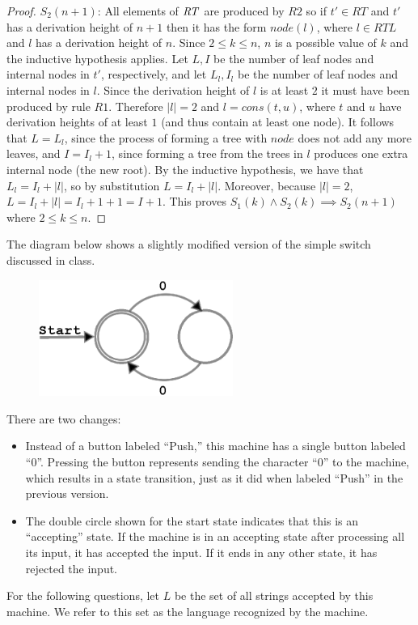 \documentclass[]{exam}
\begin{document}
\begin{questions}
\begin{parts}
\begin{solution}
\begin{proof}
$S_2(n+1)$: All elements of $\mbox{\it RT\/}$ are produced by $R2$ so if $t' \in RT$
and $t'$ has a derivation height of $n+ 1$ then it has the form $node(l)$, where 
$l \in RTL$ and $l$ has a derivation height of $n$. Since $2 \leq k \leq n$, 
$n$ is a possible value of $k$ and the inductive hypothesis applies.  Let $L, I$ 
be the number of leaf nodes and internal nodes in $t'$, respectively, and 
let $L_l,I_l$ be the number of leaf nodes and internal nodes in $l$. Since the 
derivation height of $l$ is at least $2$ it must have been produced by
rule $R1$. Therefore $|l| = 2$ and $l = cons(t,u)$, where $t$ and $u$ have
derivation heights of at least $1$ (and thus contain at least one node).
It follows that $L = L_l$, since the process of forming a tree with $node$ 
does not add any more leaves, and $I = I_l + 1$, since forming a tree from 
the trees in $l$ produces one extra internal node (the new root). By the 
inductive hypothesis, we have that $L_l = I_l + |l|$, so by substitution 
$L = I_l + |l|$. Moreover, because $|l| = 2$, $L = I_l + |l| = I_l + 1 + 1 = I +
1$. This proves $S_1(k) \land S_2(k) \implies S_2(n+1)$ where $2 \leq k \leq n$.
\end{proof}
\end{solution}
\end{parts}
\question The diagram below shows a slightly modified version of the simple
switch discussed in class. \\
\begin{figure}[h]
\centering
\includegraphics[width=2.5in, height=.75in,keepaspectratio=true]{evenzeroautomata.eps}
\label{2sp}
\end{figure}

There are two changes:
\begin{itemize}
\item Instead of a button labeled ``Push,'' this machine has a single button
labeled ``0''. Pressing the button represents sending the character ``0''
to the machine, which results in a state transition, just as it did when labeled
``Push'' in the previous version.
\item The double circle shown for the start state indicates that this is an
``accepting'' state. If the machine is in an accepting state after processing
all its input, it has accepted the input. If it ends in any other state, it has
rejected the input.
\end{itemize}
For the following questions, let $L$ be the set of all strings accepted by this machine. 
We refer to this set as the language recognized by the machine.


\end{questions}
\end{document}
